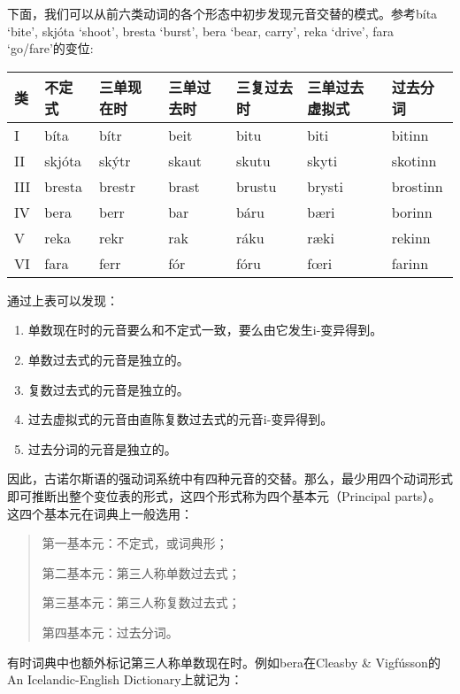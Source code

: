 下面，我们可以从前六类动词的各个形态中初步发现元音交替的模式。参考bíta `bite', skjóta `shoot', bresta `burst', bera `bear, carry', reka `drive‌', fara `go/fare‌'的变位:
\begin{longtable}{lllllll}
    \toprule
    类   & 不定式    & 三单现在时  & 三单过去时 & 三复过去时  & 三单过去虚拟式 & 过去分词     \\
    \midrule
    \endhead
    \bottomrule
    \endfoot
    I   & bíta   & bítr   & beit  & bitu   & biti    & bitinn   \\
    II  & skjóta & skýtr  & skaut & skutu  & skyti   & skotinn  \\
    III & bresta & brestr & brast & brustu & brysti  & brostinn \\
    IV  & bera   & berr   & bar   & báru   & bæri    & borinn   \\
    V   & reka   & rekr   & rak   & ráku   & ræki    & rekinn   \\
    VI  & fara   & ferr   & fór   & fóru   & fœri    & farinn   \\
\end{longtable}

通过上表可以发现：
\begin{info}
    \begin{enumerate}
        \item  单数现在时的元音要么和不定式一致，要么由它发生i-变异得到。
        \item  单数过去式的元音是独立的。
        \item  复数过去式的元音是独立的。
        \item  过去虚拟式的元音由直陈复数过去式的元音i-变异得到。
        \item  过去分词的元音是独立的。
    \end{enumerate}
\end{info}

因此，古诺尔斯语的强动词系统中有四种元音的交替。那么，最少用四个动词形式即可推断出整个变位表的形式，这四个形式称为四个基本元（Principal parts）。这四个基本元在词典上一般选用：
\begin{quote}
    第一基本元：不定式，或词典形；

    第二基本元：第三人称单数过去式；

    第三基本元：第三人称复数过去式；

    第四基本元：过去分词。
\end{quote}

有时词典中也额外标记第三人称单数现在时。例如bera在Cleasby \& Vigfússon的An Icelandic-English Dictionary上就记为：

